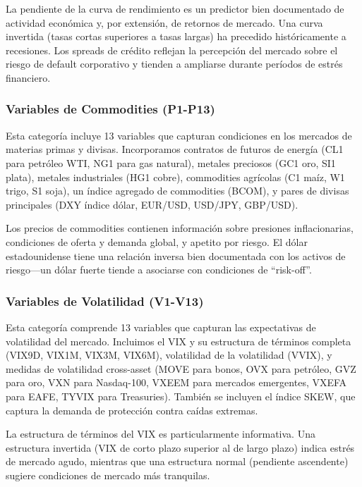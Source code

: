 \documentclass[11pt,a4paper]{article}
\begin{document}
La pendiente de la curva de rendimiento es un predictor bien documentado de actividad económica y, por extensión, de retornos de mercado. Una curva invertida (tasas cortas superiores a tasas largas) ha precedido históricamente a recesiones. Los spreads de crédito reflejan la percepción del mercado sobre el riesgo de default corporativo y tienden a ampliarse durante períodos de estrés financiero.

\subsubsection{Variables de Commodities (P1-P13)}

Esta categoría incluye 13 variables que capturan condiciones en los mercados de materias primas y divisas. Incorporamos contratos de futuros de energía (CL1 para petróleo WTI, NG1 para gas natural), metales preciosos (GC1 oro, SI1 plata), metales industriales (HG1 cobre), commodities agrícolas (C1 maíz, W1 trigo, S1 soja), un índice agregado de commodities (BCOM), y pares de divisas principales (DXY índice dólar, EUR/USD, USD/JPY, GBP/USD).

Los precios de commodities contienen información sobre presiones inflacionarias, condiciones de oferta y demanda global, y apetito por riesgo. El dólar estadounidense tiene una relación inversa bien documentada con los activos de riesgo---un dólar fuerte tiende a asociarse con condiciones de ``risk-off''.

\subsubsection{Variables de Volatilidad (V1-V13)}

Esta categoría comprende 13 variables que capturan las expectativas de volatilidad del mercado. Incluimos el VIX y su estructura de términos completa (VIX9D, VIX1M, VIX3M, VIX6M), volatilidad de la volatilidad (VVIX), y medidas de volatilidad cross-asset (MOVE para bonos, OVX para petróleo, GVZ para oro, VXN para Nasdaq-100, VXEEM para mercados emergentes, VXEFA para EAFE, TYVIX para Treasuries). También se incluyen el índice SKEW, que captura la demanda de protección contra caídas extremas.

La estructura de términos del VIX es particularmente informativa. Una estructura invertida (VIX de corto plazo superior al de largo plazo) indica estrés de mercado agudo, mientras que una estructura normal (pendiente ascendente) sugiere condiciones de mercado más tranquilas.
\end{document}
